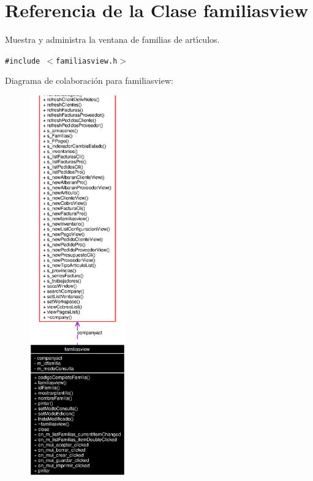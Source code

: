 \section{Referencia de la Clase familiasview}
\label{classfamiliasview}
Muestra y administra la ventana de familias de art\'{\i}culos.  


{\tt \#include $<$familiasview.h$>$}

Diagrama de colaboraci\'{o}n para familiasview:\begin{figure}[H]
\begin{center}
\leavevmode
\includegraphics[width=118pt]{classfamiliasview__coll__graph}
\end{center}
\end{figure}
